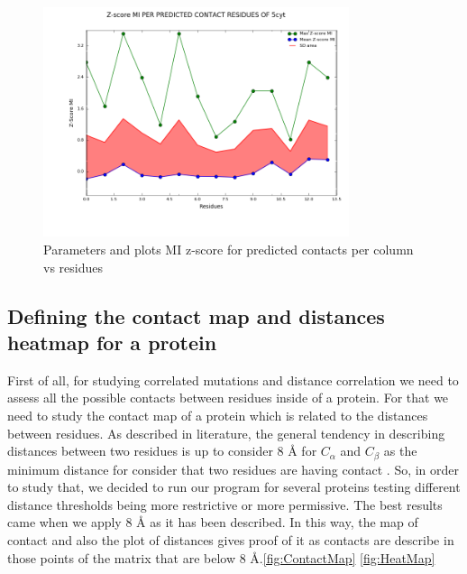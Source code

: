 \documentclass[12pt]{article}
\begin{document}
\begin{figure}[h]
\centering
\includegraphics[width=0.8\textwidth]{figure1_Z-scoreMI_max_mean_5cyt_p_CB.png}
\caption{Parameters and plots MI z-score for predicted contacts per column vs residues}
\label{fig:MIZ}
\end{figure}

\subsection{Defining the contact map and distances heatmap for a protein}
First of all, for studying correlated mutations and distance correlation we need to assess all the possible contacts between residues inside of a protein. For that we need to study the contact map of a protein which is related to the distances between residues. As described in literature, the general tendency in describing distances between two residues is up to consider 8 \r{A} for $C_{\alpha}$ and $C_{\beta}$ as the minimum distance for consider that two residues are having contact . So, in order to study that, we decided to run our program for several proteins testing different distance thresholds being more restrictive or more permissive. The best results came when we apply 8 \r{A} as it has been described. In this way, the map of contact and also the plot of distances gives proof of it as contacts are describe in those points of the matrix that are below 8 \r{A}.\ref{fig:ContactMap} \ref{fig:HeatMap} \\
\end{document}
